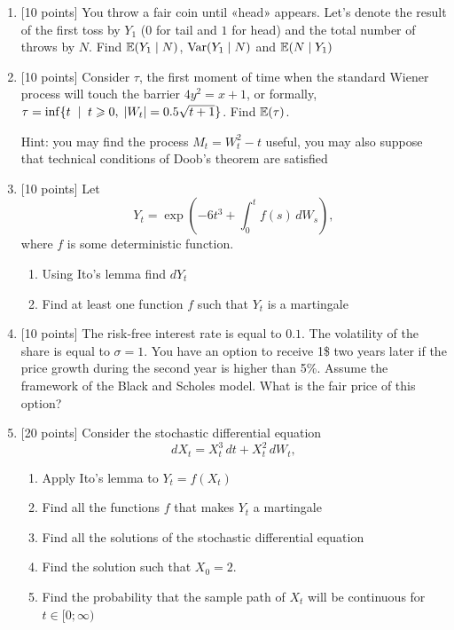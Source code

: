 \documentclass[12pt, a4paper]{article}
\DeclarePairedDelimiter{\abs}{\lvert}{\rvert}
\begin{document}
\begin{enumerate}


\item $[$10 points] You throw a fair coin until «head» appears. Let's denote the result of the first toss by $Y_1$ ($0$ for tail and $1$ for head) and the total number of throws by $N$. 
Find $\operatorname{\mathbb{E}}(Y_1 \mid N)$, $\operatorname{Var}(Y_1 \mid N)$ and $\operatorname{\mathbb{E}}(N \mid Y_1)$

\item $[$10 points] Consider $\tau$, the first moment of time when the standard Wiener process will touch the barrier $4y^2=x+1$, or formally, $\tau = \inf\{t \; \mid \; t \geq 0, \; \abs{W_t}= 0.5 \sqrt{t+1} \}$. Find $\operatorname{\mathbb{E}}(\tau)$.

Hint: you may find the process $M_t=W_t^2 - t$ useful, you may also suppose that technical conditions of Doob's theorem are satisfied


\item $[$10 points] Let
\[
Y_t = \exp \left(-6t^3 + \int_0^t f(s)\, dW_s \right),
\]
where $f$ is some deterministic function.

\begin{enumerate}
\item Using Ito's lemma find $dY_t$
\item Find at least one function $f$ such that $Y_t$ is a martingale
\end{enumerate}

\item $[$10 points] The risk-free interest rate is equal to $0.1$. The volatility of the share is equal to $\sigma=1$. You have an option to receive 1\$ two years later if the price growth during the second year is higher than 5\%. Assume the framework of the Black and Scholes model. What is the fair price of this option?

\item $[$20 points] Consider the stochastic differential equation
\[
dX_t = X_t^3 \, dt + X_t^2 \, dW_t,
\]

\begin{enumerate}
\item Apply Ito's lemma to $Y_t=f(X_t)$
\item Find all the functions $f$ that makes $Y_t$ a martingale
\item Find all the solutions of the stochastic differential equation
\item Find the solution such that $X_0 = 2$.
\item Find the probability that the sample path of $X_t$ will be continuous for $t \in [0; \infty)$
\end{enumerate}

\end{enumerate}
\end{document}
